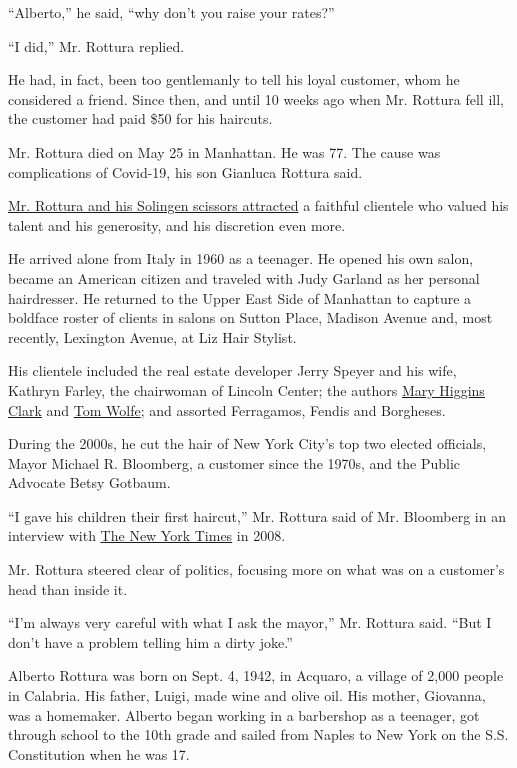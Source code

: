 ``Alberto,'' he said, ``why don't you raise your rates?''

``I did,'' Mr. Rottura replied.

He had, in fact, been too gentlemanly to tell his loyal customer, whom
he considered a friend. Since then, and until 10 weeks ago when Mr.
Rottura fell ill, the customer had paid \$50 for his haircuts.

Mr. Rottura died on May 25 in Manhattan. He was 77. The cause was
complications of Covid-19, his son Gianluca Rottura said.

\href{https://www.nytimes.com/2008/11/01/nyregion/01hairdresser.html}{Mr.
Rottura and his Solingen scissors attracted} a faithful clientele who
valued his talent and his generosity, and his discretion even more.

He arrived alone from Italy in 1960 as a teenager. He opened his own
salon, became an American citizen and traveled with Judy Garland as her
personal hairdresser. He returned to the Upper East Side of Manhattan to
capture a boldface roster of clients in salons on Sutton Place, Madison
Avenue and, most recently, Lexington Avenue, at Liz Hair Stylist.

His clientele included the real estate developer Jerry Speyer and his
wife, Kathryn Farley, the chairwoman of Lincoln Center; the authors
\href{https://www.nytimes.com/2020/01/31/books/mary-higgins-clark-dead.html}{Mary
Higgins Clark} and
\href{https://www.nytimes.com/2018/05/15/obituaries/tom-wolfe-pyrotechnic-nonfiction-writer-and-novelist-dies-at-88.html}{Tom
Wolfe}; and assorted Ferragamos, Fendis and Borgheses.

During the 2000s, he cut the hair of New York City's top two elected
officials, Mayor Michael R. Bloomberg, a customer since the 1970s, and
the Public Advocate Betsy Gotbaum.

``I gave his children their first haircut,'' Mr. Rottura said of Mr.
Bloomberg in an interview with
\href{https://www.nytimes.com/2008/11/01/nyregion/01hairdresser.html}{The
New York Times} in 2008.

Mr. Rottura steered clear of politics, focusing more on what was on a
customer's head than inside it.

``I'm always very careful with what I ask the mayor,'' Mr. Rottura said.
``But I don't have a problem telling him a dirty joke.''

Alberto Rottura was born on Sept. 4, 1942, in Acquaro, a village of
2,000 people in Calabria. His father, Luigi, made wine and olive oil.
His mother, Giovanna, was a homemaker. Alberto began working in a
barbershop as a teenager, got through school to the 10th grade and
sailed from Naples to New York on the S.S. Constitution when he was 17.

